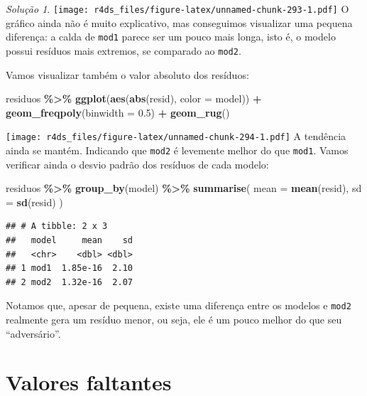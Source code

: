 \documentclass[
]{latex/krantz}
\newenvironment{Shaded}{\begin{snugshade}}{\end{snugshade}}
\newcommand{\AttributeTok}[1]{\textcolor[rgb]{0.13,0.29,0.53}{#1}}
\newcommand{\FloatTok}[1]{\textcolor[rgb]{0.00,0.00,0.81}{#1}}
\newcommand{\FunctionTok}[1]{\textcolor[rgb]{0.13,0.29,0.53}{\textbf{#1}}}
\newcommand{\NormalTok}[1]{#1}
\newcommand{\SpecialCharTok}[1]{\textcolor[rgb]{0.81,0.36,0.00}{\textbf{#1}}}
\theoremstyle{definition}
\theoremstyle{definition}
\theoremstyle{definition}
\theoremstyle{definition}
\theoremstyle{remark}
\newtheorem*{solution}{Solução}
\begin{document}
\begin{solution}
\texttt{[image: r4ds\_files/figure-latex/unnamed-chunk-293-1.pdf]}
O gráfico ainda não é muito explicativo, mas conseguimos visualizar uma pequena diferença: a calda de \texttt{mod1} parece ser um pouco mais longa, isto é, o modelo possui resíduos mais extremos, se comparado ao \texttt{mod2}.

Vamos visualizar também o valor absoluto dos resíduos:

\begin{Shaded}
\begin{Highlighting}[]
\NormalTok{residuos }\SpecialCharTok{\%\textgreater{}\%}
  \FunctionTok{ggplot}\NormalTok{(}\FunctionTok{aes}\NormalTok{(}\FunctionTok{abs}\NormalTok{(resid), }\AttributeTok{color =}\NormalTok{ model)) }\SpecialCharTok{+}
    \FunctionTok{geom\_freqpoly}\NormalTok{(}\AttributeTok{binwidth =} \FloatTok{0.5}\NormalTok{) }\SpecialCharTok{+}
    \FunctionTok{geom\_rug}\NormalTok{()}
\end{Highlighting}
\end{Shaded}

\texttt{[image: r4ds\_files/figure-latex/unnamed-chunk-294-1.pdf]}
A tendência ainda se mantém. Indicando que \texttt{mod2} é levemente melhor do que \texttt{mod1}. Vamos verificar ainda o desvio padrão dos resíduos de cada modelo:

\begin{Shaded}
\begin{Highlighting}[]
\NormalTok{residuos }\SpecialCharTok{\%\textgreater{}\%}
  \FunctionTok{group\_by}\NormalTok{(model) }\SpecialCharTok{\%\textgreater{}\%}
  \FunctionTok{summarise}\NormalTok{(}
    \AttributeTok{mean =} \FunctionTok{mean}\NormalTok{(resid),}
    \AttributeTok{sd =} \FunctionTok{sd}\NormalTok{(resid)}
\NormalTok{  )}
\end{Highlighting}
\end{Shaded}

\begin{verbatim}
## # A tibble: 2 x 3
##   model     mean    sd
##   <chr>    <dbl> <dbl>
## 1 mod1  1.85e-16  2.10
## 2 mod2  1.32e-16  2.07
\end{verbatim}

Notamos que, apesar de pequena, existe uma diferença entre os modelos e \texttt{mod2} realmente gera um resíduo menor, ou seja, ele é um pouco melhor do que seu ``adversário''.
\end{solution}

\hypertarget{valores-faltantes-2}{%
\section{Valores faltantes}\label{valores-faltantes-2}}
\end{document}
